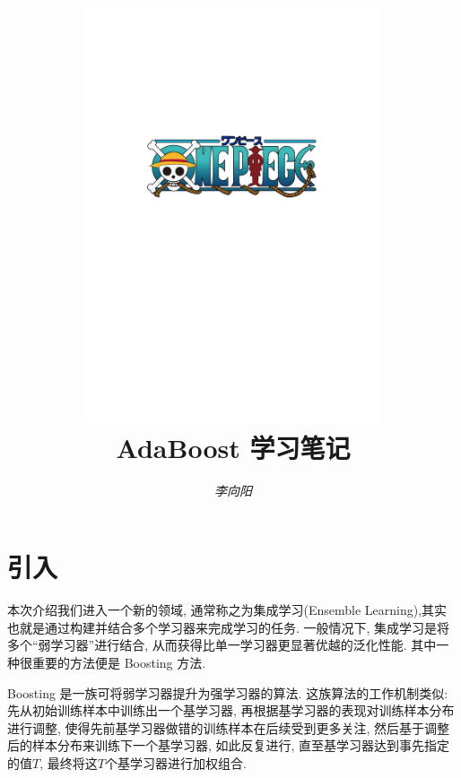 \documentclass[a4paper,UTF8]{ctexart}
\theoremstyle{plain} \newtheorem{theorem}{定理}[section]
\theoremstyle{plain} \newtheorem{definition}{定义}[section]
\theoremstyle{plain} \newtheorem{lemma}{引理}[section]
\theoremstyle{plain} \newtheorem{proposition}{命题}[section]
\theoremstyle{plain} \newtheorem{example}{例}[section]
\theoremstyle{plain} \newtheorem{remark}{注}[section]
\theoremstyle{plain} \newtheorem{corollary}{推论}[section]
\begin{document}
\title{
\includegraphics[width=0.65\textwidth]{onepiece.pdf}\\
\vspace{2em}
\textbf{AdaBoost 学习笔记}}
\author{\emph{李向阳}  }
\date{}


\maketitle
\thispagestyle{empty}

\newpage


\tableofcontents

\newpage

\section{引入}
本次介绍我们进入一个新的领域, 通常称之为集成学习(Ensemble Learning),其实也就是通过构建并结合多个学习器来完成学习的任务. 一般情况下, 集成学习是将多个“弱学习器”进行结合, 从而获得比单一学习器更显著优越的泛化性能. 其中一种很重要的方法便是 Boosting 方法.

Boosting 是一族可将弱学习器提升为强学习器的算法. 这族算法的工作机制类似: 先从初始训练样本中训练出一个基学习器, 再根据基学习器的表现对训练样本分布进行调整, 使得先前基学习器做错的训练样本在后续受到更多关注, 然后基于调整后的样本分布来训练下一个基学习器, 如此反复进行, 直至基学习器达到事先指定的值$T$, 最终将这$T$个基学习器进行加权组合.
\end{document}
